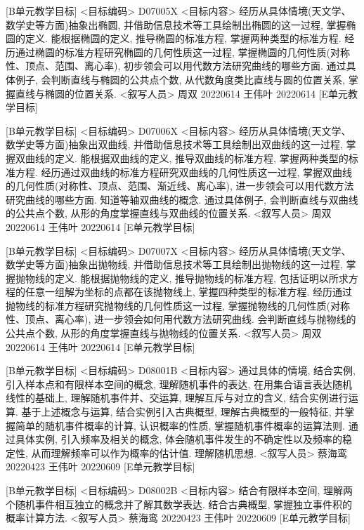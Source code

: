 \documentclass[10pt,a4paper]{article}
\begin{document}
[B单元教学目标]
<目标编码>
D07005X
<目标内容>
经历从具体情境(天文学、数学史等方面)抽象出椭圆, 并借助信息技术等工具绘制出椭圆的这一过程, 掌握椭圆的定义. 能根据椭圆的定义, 推导椭圆的标准方程, 掌握两种类型的标准方程. 经历通过椭圆的标准方程研究椭圆的几何性质这一过程, 掌握椭圆的几何性质(对称性、顶点、范围、离心率), 初步领会可以用代数方法研究曲线的哪些方面. 通过具体例子, 会判断直线与椭圆的公共点个数, 从代数角度类比直线与圆的位置关系, 掌握直线与椭圆的位置关系.
<叙写人员>
周双    20220614
王伟叶  20220614
[E单元教学目标]

[B单元教学目标]
<目标编码>
D07006X
<目标内容>
经历从具体情境(天文学、数学史等方面)抽象出双曲线, 并借助信息技术等工具绘制出双曲线的这一过程, 掌握双曲线的定义. 能根据双曲线的定义, 推导双曲线的标准方程, 掌握两种类型的标准方程. 经历通过双曲线的标准方程研究双曲线的几何性质这一过程, 掌握双曲线的几何性质(对称性、顶点、范围、渐近线、离心率), 进一步领会可以用代数方法研究曲线的哪些方面. 知道等轴双曲线的概念. 通过具体例子, 会判断直线与双曲线的公共点个数, 从形的角度掌握直线与双曲线的位置关系.
<叙写人员>
周双    20220614
王伟叶  20220614
[E单元教学目标]

[B单元教学目标]
<目标编码>
D07007X
<目标内容>
经历从具体情境(天文学、数学史等方面)抽象出抛物线, 并借助信息技术等工具绘制出抛物线的这一过程, 掌握抛物线的定义. 能根据抛物线的定义, 推导抛物线的标准方程, 包括证明以所求方程的任意一组解为坐标的点都在该抛物线上, 掌握四种类型的标准方程. 经历通过抛物线的标准方程研究抛物线的几何性质这一过程, 掌握抛物线的几何性质(对称性、顶点、离心率), 进一步领会如何用代数方法研究曲线. 会判断直线与抛物线的公共点个数, 从形的角度掌握直线与抛物线的位置关系.
<叙写人员>
周双    20220614
王伟叶  20220614
[E单元教学目标]




[B单元教学目标]
<目标编码>
D08001B
<目标内容>
通过具体的情境, 结合实例, 引入样本点和有限样本空间的概念, 理解随机事件的表达, 在用集合语言表达随机线性的基础上, 理解随机事件并、交运算, 理解互斥与对立的含义, 结合实例进行运算. 基于上述概念与运算, 结合实例引入古典概型, 理解古典概型的一般特征, 并掌握简单的随机事件概率的计算, 认识概率的性质, 掌握随机事件概率的运算法则. 通过具体实例, 引入频率及相关的概念, 体会随机事件发生的不确定性以及频率的稳定性, 从而理解频率可以作为概率的估计值. 理解随机思想.
<叙写人员>
蔡海鸾  20220423
王伟叶  20220609
[E单元教学目标]

[B单元教学目标]
<目标编码>
D08002B
<目标内容>
结合有限样本空间, 理解两个随机事件相互独立的概念并了解其数学表达. 结合古典概型, 掌握独立事件积的概率计算方法.
<叙写人员>
蔡海鸾  20220423
王伟叶  20220609
[E单元教学目标]
\end{document}
